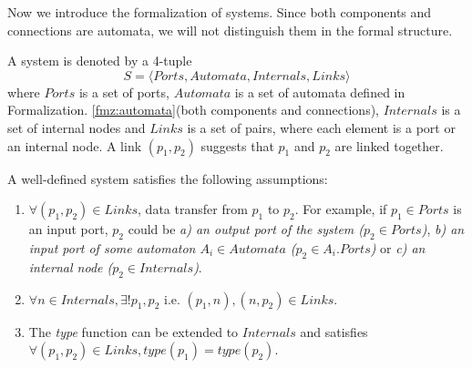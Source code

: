 Now we introduce the formalization of systems. Since both components and connections are automata, we will not distinguish them in the formal structure.

\begin{formalization}[System]
    A system is denoted by a 4-tuple
    \[
        S=\langle Ports, Automata, Internals, Links\rangle
    \] where $Ports$ is a set of ports, $Automata$ is a set of automata defined in Formalization. \ref{fmz:automata}(both components and connections), $Internals$ is a set of internal nodes and $Links$ is a set of pairs, where each element is a port or an internal node. A link $(p_1,p_2)$ suggests that $p_1$ and $p_2$ are linked together.
\end{formalization}
A well-defined system satisfies the following assumptions:
\begin{enumerate}
    \item $\forall (p_1,p_2)\in Links$, data transfer from $p_1$ to $p_2$. For example, if $p_1\in Ports$ is an input port, $p_2$ could be \emph{a) an output port of the system ($p_2\in Ports$)}, \emph{b) an input port of some automaton $A_i\in Automata$ ($p_2\in A_i.Ports$)} or \emph{c) an internal node ($p_2\in Internals$)}.
    \item $\forall n\in Internals,\exists!p_1,p_2$ i.e. $(p_1,n),(n,p_2)\in Links$.
    \item The \emph{type} function can be extended to $Internals$ and satisfies $\forall (p_1,p_2)\in Links, type(p_1)=type(p_2)$.
\end{enumerate}

\label{subsec:functions}